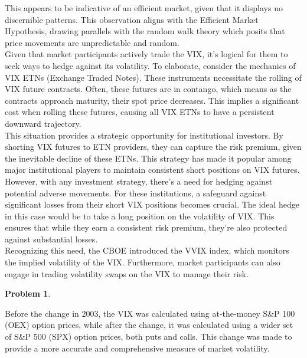 \documentclass[12pt, a4paper]{article}
\newtheorem{problem}{Problem}
\theoremstyle{definition}
\begin{document}
This appears to be indicative of an efficient market, given that it displays no discernible patterns. This observation aligns with the Efficient Market Hypothesis, drawing parallels with the random walk theory which posits that price movements are unpredictable and random.
\\

\quad Given that market participants actively trade the VIX, it's logical for them to seek ways to hedge against its volatility. To elaborate, consider the mechanics of VIX ETNs (Exchange Traded Notes). These instruments necessitate the rolling of VIX future contracts. Often, these futures are in contango, which means as the contracts approach maturity, their spot price decreases. This implies a significant cost when rolling these futures, causing all VIX ETNs to have a persistent downward trajectory.
\\

\quad This situation provides a strategic opportunity for institutional investors. By shorting VIX futures to ETN providers, they can capture the risk premium, given the inevitable decline of these ETNs. This strategy has made it popular among major institutional players to maintain consistent short positions on VIX futures.
\\

\quad However, with any investment strategy, there's a need for hedging against potential adverse movements. For these institutions, a safeguard against significant losses from their short VIX positions becomes crucial. The ideal hedge in this case would be to take a long position on the volatility of VIX. This ensures that while they earn a consistent risk premium, they're also protected against substantial losses.
\\

\quad Recognizing this need, the CBOE introduced the VVIX index, which monitors the implied volatility of the VIX. Furthermore, market participants can also engage in trading volatility swaps on the VIX to manage their risk.
\begin{problem}
\end{problem}
\quad Before the change in 2003, the VIX was calculated using at-the-money S\&P 100 (OEX) option prices, while after the change, it was calculated using a wider set of S\&P 500 (SPX) option prices, both puts and calls. This change was made to provide a more accurate and comprehensive measure of market volatility.
\\
\end{document}
